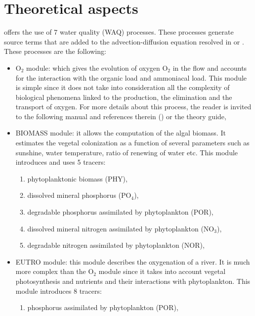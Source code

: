 \chapter{Theoretical aspects}

\waqtel offers the use of 7 water quality (WAQ) processes.
These processes generate source terms that are added to the advection-diffusion equation
resolved in  or .
These processes are the following:

\begin{itemize}
\item O$_2$ module: which gives the evolution of oxygen O$_2$ in the flow
  and accounts for the interaction with the organic load and ammoniacal load.
  This module is simple since it does not take into consideration
  all the complexity of biological phenomena linked to the production,
  the elimination and the transport of oxygen.
  For more details about this process, the reader is invited
  to the following manual and references therein (\cite{El-Kadi2012})
  or the \waqtel theory guide,

\item BIOMASS module: it allows the computation of the algal biomass.
  It estimates the vegetal colonization as a function of several parameters
  such as sunshine, water temperature, ratio of renewing of water etc.
  This module introduces and uses 5 tracers:

\begin{enumerate}
\item phytoplanktonic biomass (PHY),

\item dissolved mineral phosphorus (PO$_4$),

\item degradable phosphorus assimilated by phytoplankton (POR),

\item dissolved mineral nitrogen assimilated by phytoplankton (NO$_3$),

\item degradable nitrogen assimilated by phytoplankton (NOR),
\end{enumerate}

\item EUTRO module: this module describes the oxygenation of a river.
  It is much more complex than the O$_2$ module since it takes into account
  vegetal photosynthesis and nutrients and their interactions with phytoplankton.
  This module introduces 8 tracers:
\begin{enumerate}
\item phosphorus assimilated by phytoplankton (POR),


\end{enumerate}
\end{itemize}
